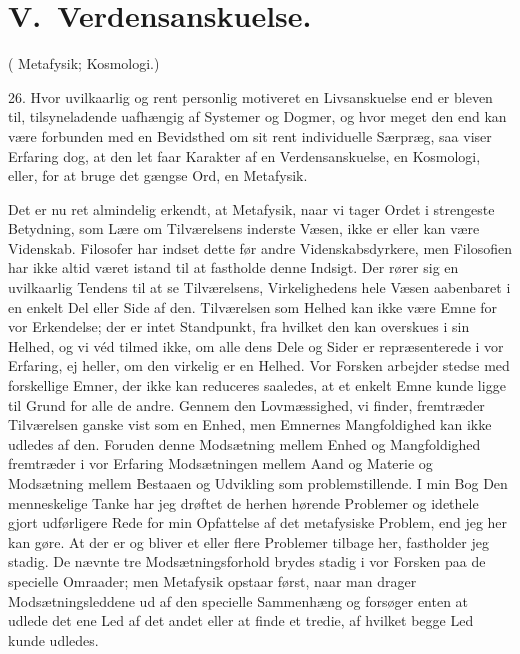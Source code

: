 \documentclass[12pt]{article}
\newcommand{\apage}[1]{\marginnote{\footnotesize\textit{[#1]}}}
\begin{document}
\section*{V.\ Verdensanskuelse.}

(
\setcounter{footnote}{0}%
\apage{81}Metafysik; Kosmologi.)

26. Hvor uvilkaarlig og rent personlig motiveret en Livsanskuelse end er bleven
til, tilsyneladende uafhængig af Systemer og Dogmer, og hvor meget den end kan
være forbunden med en Bevidsthed om sit rent individuelle Særpræg, saa viser
Erfaring dog, at den let faar Karakter af en Verdensanskuelse, en Kosmologi,
eller, for at bruge det gængse Ord, en Metafysik.

Det er nu ret almindelig erkendt, at Metafysik, naar vi tager Ordet i
strengeste Betydning, som Lære om Tilværelsens inderste Væsen, ikke er eller
kan være Videnskab. Filosofer har indset dette før andre Videnskabsdyrkere, men
Filosofien har ikke altid været istand til at fastholde denne Indsigt. Der
rører sig en uvilkaarlig Tendens til at se Tilværelsens, Virkelighedens hele
Væsen aabenbaret i en enkelt Del eller Side af den. Tilværelsen som Helhed kan
ikke være Emne for vor Erkendelse; der er intet Standpunkt, fra hvilket den kan
overskues i sin Helhed, og vi véd tilmed ikke, om alle dens Dele og Sider er
repræsenterede i vor Erfaring, ej heller, om den virkelig er en Helhed. Vor
Forsken arbejder stedse med forskellige Emner, der ikke kan reduceres saaledes,
at et enkelt Emne kunde ligge til Grund for alle de andre. Gennem den
Lovmæssighed, vi finder, fremtræder Tilværelsen ganske vist som en Enhed, men
Emnernes Mangfoldighed
\setcounter{footnote}{0}%
\apage{82}kan ikke udledes af den. Foruden denne Modsætning mellem Enhed og
Mangfoldighed fremtræder i vor Erfaring Modsætningen mellem Aand og Materie og
Modsætning mellem Bestaaen og Udvikling som problemstillende. I min Bog
\guillemotright{}Den menneskelige Tanke\guillemotleft{} har jeg drøftet de
herhen hørende Problemer og idethele gjort udførligere Rede for min Opfattelse
af det metafysiske Problem, end jeg her kan gøre. At der er og bliver et eller
flere Problemer tilbage her, fastholder jeg stadig. De nævnte tre
Modsætningsforhold brydes stadig i vor Forsken paa de specielle Omraader; men
Metafysik opstaar først, naar man drager Modsætningsleddene ud af den specielle
Sammenhæng og forsøger enten at udlede det ene Led af det andet eller at finde
et tredie, af hvilket begge Led kunde udledes.
\end{document}
